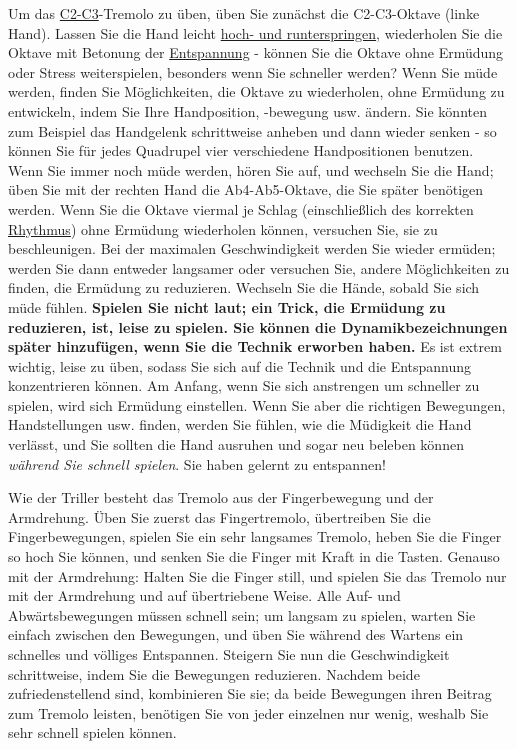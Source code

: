 Um das \hyperlink{Noten}{C2-C3}-Tremolo zu üben, üben Sie zunächst die C2-C3-Oktave (linke Hand).
Lassen Sie die Hand leicht \hyperlink{c1ii9}{hoch- und runterspringen}, wiederholen Sie die Oktave mit Betonung der \hyperlink{c1ii14}{Entspannung} - können Sie die Oktave ohne Ermüdung oder Stress weiterspielen, besonders wenn Sie schneller werden?
Wenn Sie müde werden, finden Sie Möglichkeiten, die Oktave zu wiederholen, ohne Ermüdung zu entwickeln, indem Sie Ihre Handposition, -bewegung usw. ändern.
Sie könnten zum Beispiel das Handgelenk schrittweise anheben und dann wieder senken - so können Sie für jedes Quadrupel vier verschiedene Handpositionen benutzen.
Wenn Sie immer noch müde werden, hören Sie auf, und wechseln Sie die Hand; üben Sie mit der rechten Hand die Ab4-Ab5-Oktave, die Sie später benötigen werden.
Wenn Sie die Oktave viermal je Schlag (einschließlich des korrekten \hyperlink{c1iii1b}{Rhythmus}) ohne Ermüdung wiederholen können, versuchen Sie, sie zu beschleunigen.
Bei der maximalen Geschwindigkeit werden Sie wieder ermüden; werden Sie dann entweder langsamer oder versuchen Sie, andere Möglichkeiten zu finden, die Ermüdung zu reduzieren.
Wechseln Sie die Hände, sobald Sie sich müde fühlen.
\textbf{Spielen Sie nicht laut; ein Trick, die Ermüdung zu reduzieren, ist, leise zu spielen.
Sie können die Dynamikbezeichnungen später hinzufügen, wenn Sie die Technik erworben haben.}
Es ist extrem wichtig, leise zu üben, sodass Sie sich auf die Technik und die Entspannung konzentrieren können.
Am Anfang, wenn Sie sich anstrengen um schneller zu spielen, wird sich Ermüdung einstellen.
Wenn Sie aber die richtigen Bewegungen, Handstellungen usw. finden, werden Sie fühlen, wie die Müdigkeit die Hand verlässt, und Sie sollten die Hand ausruhen und sogar neu beleben können \textit{während Sie schnell spielen}.
Sie haben gelernt zu entspannen!

Wie der Triller besteht das Tremolo aus der Fingerbewegung und der Armdrehung.
Üben Sie zuerst das Fingertremolo, übertreiben Sie die Fingerbewegungen, spielen Sie ein sehr langsames Tremolo, heben Sie die Finger so hoch Sie können, und senken Sie die Finger mit Kraft in die Tasten.
Genauso mit der Armdrehung: Halten Sie die Finger still, und spielen Sie das Tremolo nur mit der Armdrehung und auf übertriebene Weise.
Alle Auf- und Abwärtsbewegungen müssen schnell sein; um langsam zu spielen, warten Sie einfach zwischen den Bewegungen, und üben Sie während des Wartens ein schnelles und völliges Entspannen.
Steigern Sie nun die Geschwindigkeit schrittweise, indem Sie die Bewegungen reduzieren.
Nachdem beide zufriedenstellend sind, kombinieren Sie sie; da beide Bewegungen ihren Beitrag zum Tremolo leisten, benötigen Sie von jeder einzelnen nur wenig, weshalb Sie sehr schnell spielen können.

